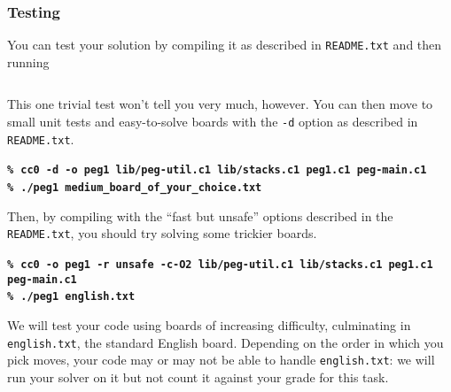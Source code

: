 \documentclass[12pt]{exam}
\begin{document}









\subsubsection*{Testing}

You can test your solution by compiling it as described in
\lstinline'README.txt' and then running
\begin{lstlisting}[language={[coin]C}]
% ./peg1 german.txt
\end{lstlisting}
This one trivial test won't tell you very much, however.  You can then
move to small unit tests and easy-to-solve boards with the
\lstinline'-d' option as described in \lstinline'README.txt'.
\par\medskip\noindent
\bgroup\bf\small
\texttt{\%}~\lstinline[language={[coin]C}]'cc0 -d -o peg1 lib/peg-util.c1 lib/stacks.c1 peg1.c1 peg-main.c1'\\
\texttt{\%}~\lstinline[language={[coin]C}]'./peg1 medium_board_of_your_choice.txt'
\egroup
\par\medskip\noindent
Then, by compiling with the ``fast but unsafe'' options described in
the \lstinline'README.txt', you should try solving some trickier boards.
\par\medskip\noindent
\bgroup\bf\small
\texttt{\%}~\lstinline[language={[coin]C}]'cc0 -o peg1 -r unsafe -c-O2 lib/peg-util.c1 lib/stacks.c1 peg1.c1 peg-main.c1'\\
\texttt{\%}~\lstinline[language={[coin]C}]'./peg1 english.txt'
\egroup
\par\medskip\noindent
We will test your code using boards of increasing difficulty,
culminating in \lstinline'english.txt', the standard English board.
Depending on the order in which you pick moves, your code may or may
not be able to handle \lstinline'english.txt': we will run your solver
on it but not count it against your grade for this task.
\end{document}
